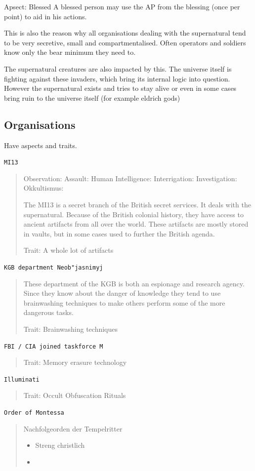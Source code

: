 \documentclass[11pt]{article}
\begin{document}
{Apsect: Blessed
A blessed person may use the AP from the blessing (once per point) to aid in his actions. 

This is also the reason why all organisations dealing with the supernatural tend to be very secretive, small and compartmentalised. Often operators and soldiers know only the bear minimum they need to. 

The supernatural creatures are also impacted by this. The universe itself is fighting against these invaders, which bring its internal logic into question. However the supernatural exists and tries to stay alive or even in some cases bring ruin to the universe itself (for example eldrich gods)

\subsection{Organisations}
\label{sec:org0180c24}
Have aspects and traits.

\texttt{MI13}
\begin{quote}
Observation: 
Assault: 
Human Intelligence: 
Interrigation: 
Investigation:
Okkultismus: 

The MI13 is a secret branch of the British secret services. It deals with the supernatural. Because of the British colonial history, they have access to ancient artifacts from all over the world. These artifacts are mostly stored in vaults, but in some cases used to further the British agenda.

Trait: A whole lot of artifacts
\end{quote}


\texttt{KGB department Neob"jasnimyj}
\begin{quote}
These department of the KGB is both an espionage and research agency. Since they know about the danger of knowledge they tend to use brainwashing techniques to make others perform some of the more dangerous tasks.

Trait: Brainwashing techniques 
\end{quote}

\texttt{FBI / CIA joined taskforce M} 
\begin{quote}
Trait: Memory erasure technology
\end{quote}

\texttt{Illuminati}
\begin{quote}
Trait: Occult Obfuscation Rituals
\end{quote}

\texttt{Order of Montessa}
\begin{quote}
Nachfolgeorden der Tempelritter
\begin{itemize}
\item Streng christlich
\item 
\end{itemize}


\end{quote}}
\end{document}
